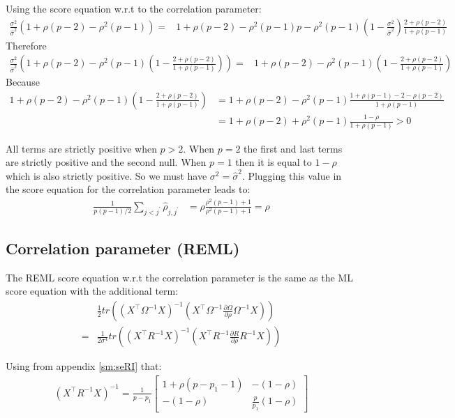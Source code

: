 \documentclass[12pt]{article}
\newcommand\trans[1]{{#1}^\intercal}%
\begin{document}
Using the score equation w.r.t to the correlation parameter:
\begin{align*}
\frac{\sigma^2}{\widehat{\sigma}^2} (1+\rho(p-2)-\rho^2(p-1)) =& 1 + \rho (p-2) - \rho^2(p-1)  p - \rho^2(p-1)\left(1- \frac{\sigma^2}{\widehat{\sigma}^2}\right) \frac{2+\rho(p-2)}{1+\rho(p-1)} 
\end{align*}
Therefore
\begin{align*}
\frac{\sigma^2}{\widehat{\sigma}^2} \left(1+\rho(p-2)-\rho^2(p-1)\left(1- \frac{2+\rho(p-2)}{1+\rho(p-1)}\right)\right) =& 1 + \rho (p-2) - \rho^2(p-1)  \left(1 - \frac{2+\rho(p-2)}{1+\rho(p-1)}\right)
\end{align*}
Because
\begin{align*}
1+\rho(p-2)-\rho^2(p-1)\left(1- \frac{2+\rho(p-2)}{1+\rho(p-1)}\right) &= 1+\rho(p-2)-\rho^2(p-1)\frac{1+\rho(p-1)-2-\rho(p-2)}{1+\rho(p-1)} \\
&= 1+\rho(p-2)+\rho^2(p-1)\frac{1-\rho}{1+\rho(p-1)}>0
\end{align*}

All terms are strictly positive when \(p>2\). When \(p=2\) the
first and last terms are strictly positive and the second null. When
\(p=1\) then it is equal to \(1-\rho\) which is also strictly
positive. So we must have \(\sigma^2 = \widehat{\sigma}^2\). Plugging
this value in the score equation for the correlation parameter leads
to:
\begin{align*}
\frac{1}{p(p-1)/2}\sum_{j < j^{\prime}}\widehat{\rho}_{j,j^{\prime}} &= \rho
\frac{\rho^2(p-1) + 1}{\rho^2(p-1) + 1} = \rho
\end{align*}

\subsection{Correlation parameter (REML)}
\label{sec:org0b2762b}

The REML score equation w.r.t the correlation parameter is the same as the ML score equation with the additional term:
\begin{align*}
&\frac{1}{2} tr\left(\left(\trans{X}\Omega^{-1}X\right)^{-1} \left(\trans{X}\Omega^{-1}\frac{\partial \Omega}{\partial\rho}\Omega^{-1}X \right) \right) \\
=&\frac{1}{2 \sigma^4} tr\left(\left(\trans{X}R^{-1}X\right)^{-1} \left(\trans{X}R^{-1}\frac{\partial R}{\partial\rho}R^{-1}X \right) \right) 
\end{align*}

Using from appendix \ref{sm:seRI} that:
\begin{align*}
\left(\trans{X}R^{-1}X\right)^{-1} = \frac{1}{p-p_1} \begin{bmatrix} 1+\rho (p-p_1-1)
                  & -(1-\rho)
                  \\ -(1-\rho)
                  & \frac{p}{p_1}(1-\rho)
                  \end{bmatrix}
\end{align*}
\end{document}
